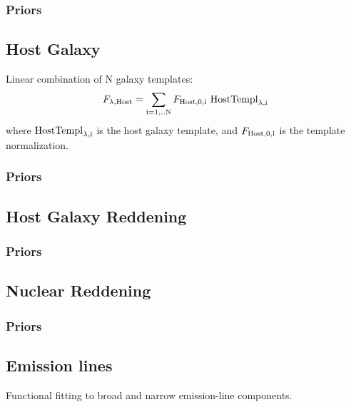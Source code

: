 \documentclass[12pt,letterpaper]{article}
\begin{document}
\subsubsection*{Priors}

\subsection*{Host Galaxy}
Linear combination of N galaxy templates:
\begin{equation}
F_{\lambda {\rm{,Host}}} = \sum_{\rm i=1,..N} F_{\rm{Host,0,i}} \  {\rm HostTempl}_{\rm{\lambda,i}} 
\end{equation}
where ${\rm HostTempl}_{\rm{\lambda,i}}$ is the host galaxy template, and $F_{\rm Host,0,i}$ is the template normalization.

\subsubsection*{Priors}

\subsection*{Host Galaxy Reddening}

\subsubsection*{Priors}

\subsection*{Nuclear Reddening}

\subsubsection*{Priors}

\subsection*{Emission lines}
Functional fitting to broad and narrow emission-line components.
\end{document}
